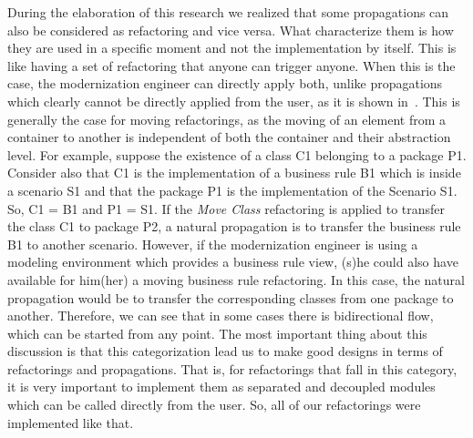 During the elaboration of this research we realized that some propagations can also be considered as refactoring and vice versa. What characterize them is how they are used in a specific moment and not the implementation by itself. This is like having a set of refactoring that anyone can trigger anyone. When this is the case, the modernization engineer can directly apply both, unlike propagations which clearly cannot be directly applied from the user, as it is shown in~\cite{ICSOFT2014_Winetzhammer}. This is generally the case for moving refactorings, as the moving of an element from a container to another is independent of both the container and their abstraction level. For example, suppose the existence of a class C1 belonging to a package P1. Consider also that C1 is the implementation of a business rule B1 which is inside a scenario S1 and that the package P1 is the implementation of the Scenario S1. So, C1 = B1 and P1 = S1. If the \textit{Move Class} refactoring is applied to transfer the class C1 to package P2, a natural propagation is to transfer the business rule B1 to another scenario. However, if the modernization engineer is using a modeling environment which provides a business rule view, (s)he could also have available for him(her) a moving business rule refactoring. In this case, the natural propagation would be to transfer the corresponding classes from one package to another. Therefore, we can see that in some cases there is bidirectional flow, which can be started from any point. 
%
%
%
The most important thing about this discussion is that this categorization lead us to make good designs in terms of refactorings and propagations. That is, for refactorings that fall in this category, it is very important to implement them as separated and decoupled modules which can be called directly from the user. So, all of our refactorings were implemented like that. 
